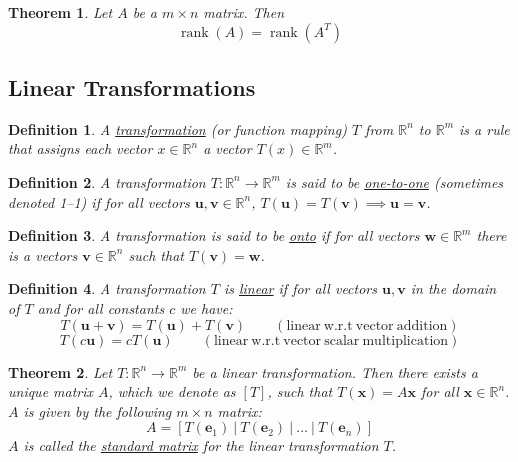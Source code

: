 \documentclass{article}
\theoremstyle{definitionstyle}
\newtheorem{definition}{Definition}[section]
\newtheorem{theorem}{Theorem}[section]
\begin{document}
\begin{theorem}
    Let $A$ be a $m \times n$ matrix. Then
    \begin{equation*}
        \operatorname*{rank}(A)=\operatorname*{rank}(A^T)
    \end{equation*}
\end{theorem}

\subsection{Linear Transformations}

\begin{definition}
    A \underline{transformation} (or function mapping) $T$ from $\mathbb{R}^n$
    to $\mathbb{R}^m$ is a rule that assigns each vector $x \in \mathbb{R}^n$ a vector
    $T(x) \in \mathbb{R}^m$.
\end{definition}

\begin{definition}
    A transformation $T:\mathbb{R}^n \to \mathbb{R}^m$ is said to be \underline{one-to-one} 
    (sometimes denoted 1--1) if for all vectors $\mathbf{u}, \mathbf{v} \in \mathbb{R}^n$, $T(\mathbf{u})=T(\mathbf{v}) \implies \mathbf{u}=\mathbf{v}$.
\end{definition}

\begin{definition}
    A transformation is said to be \underline{onto} if for all vectors $\mathbf{w} \in \mathbb{R}^m$
    there is a vectors $\mathbf{v} \in \mathbb{R}^n$ such that $T(\mathbf{v})=\mathbf{w}$.
\end{definition}

\begin{definition}
    A transformation $T$ is \underline{linear} if for all vectors $\mathbf{u}, \mathbf{v}$ in the domain
    of $T$ and for all constants $c$ we have:
    \begin{equation*}
        T(\mathbf{u} + \mathbf{v})=T(\mathbf{u})+T(\mathbf{v}) \qquad \mathrm{(linear \: w.r.t \: vector \: addition)}
    \end{equation*}
    \begin{equation*}
        T(c\mathbf{u})=cT(\mathbf{u}) \qquad \mathrm{(linear \: w.r.t \: vector \: scalar \: multiplication)}
    \end{equation*}
\end{definition}

\begin{theorem}
    Let $T: \mathbb{R}^n \to \mathbb{R}^m$ be a linear transformation. Then there exists
    a unique matrix $A$, which we denote as $[T]$, such that $T(\mathbf{x})=A\mathbf{x}$ for all
    $\mathbf{x} \in \mathbb{R}^n$. $A$ is given by the following $m \times n$ matrix:
    \begin{equation*}
        A=[T(\mathbf{e}_1) \ |\ T(\mathbf{e}_2) \ |\ \dots \ |\ T(\mathbf{e}_n)]
    \end{equation*}
    $A$ is called the \underline{standard matrix} for the linear transformation $T$.
\end{theorem}
\end{document}
